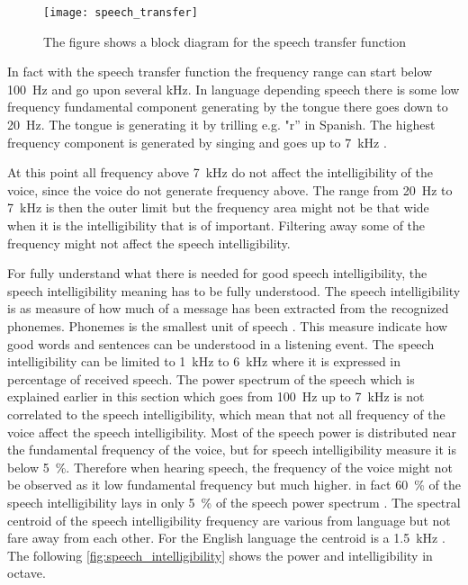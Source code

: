  \begin{figure}[H]
	\centering
		\texttt{[image: speech\_transfer]}
		\caption{The figure shows a block diagram for the speech transfer function \citep{pulkki2015}}
		\label{fig:speech_transfer_system}
\end{figure}


In fact with the speech transfer function the frequency range can start below \SI{100}{\hertz} and go upon several \si{\kilo\hertz}. In language depending speech there is some low frequency fundamental component generating by the tongue there goes down to \SI{20}{\hertz}. The tongue is generating it by trilling e.g. "r'' in Spanish. The highest frequency component is generated by singing and goes up to \SI{7}{\kilo\hertz} \citep{pulkki2015}.

At this point all frequency above  \SI{7}{\kilo\hertz} do not affect the intelligibility of the voice, since the voice do not generate frequency above. The range from \SI{20}{\hertz} to \SI{7}{\kilo\hertz} is then the outer limit but the frequency area might not be that wide when it is the intelligibility that is of important. Filtering away some of the frequency might not affect the speech intelligibility. 

For fully understand what there is needed for good speech intelligibility, the speech intelligibility meaning has to be fully understood. The speech intelligibility is as measure of how much of a message has been extracted from the recognized phonemes. Phonemes is the smallest unit of speech \citep{arl_us_army}. This measure indicate how good words and sentences can be understood in a listening event. The speech intelligibility can be limited to \SI{1}{\kilo\hertz} to \SI{6}{\kilo\hertz} where it is expressed in percentage of received speech. The power spectrum of the speech which is explained earlier in this section which goes from  \SI{100}{\hertz} up to \SI{7}{\kilo\hertz} is not correlated to the speech intelligibility, which mean that not all frequency of the voice affect the speech intelligibility. Most of the speech power is distributed near the fundamental frequency of the voice, but for speech intelligibility measure it is below \SI{5}{\percent}. Therefore when hearing speech, the frequency of the voice might not be observed as it low fundamental frequency but much higher. in fact \SI{60}{\percent} of the speech intelligibility lays in only \SI{5}{\percent} of the speech power spectrum \citep{arl_us_army}. The spectral centroid of the speech intelligibility frequency are various from language but not fare away from each other. For the English language the centroid is a \SI{1.5}{\kilo\hertz} \citep{arl_us_army}. The following \autoref{fig:speech_intelligibility} shows the power and intelligibility in octave. 


